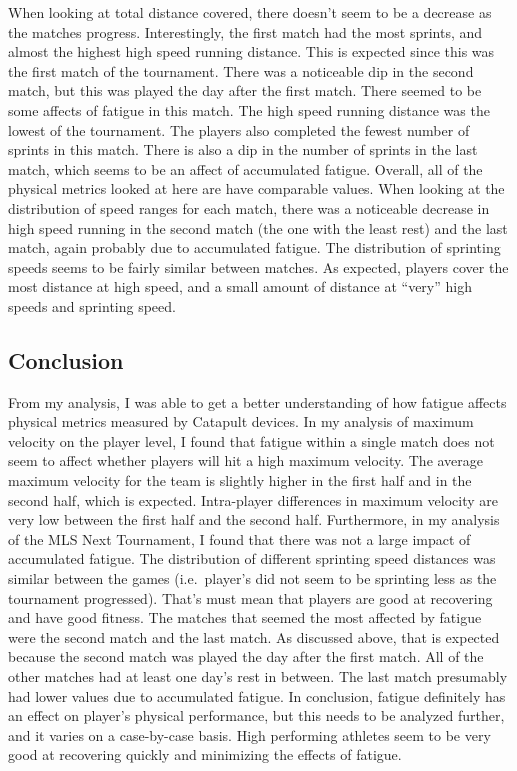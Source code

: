\documentclass[
  letterpaper,
  DIV=11,
  numbers=noendperiod]{scrartcl}
\begin{document}
When looking at total distance covered, there doesn't seem to be a
decrease as the matches progress. Interestingly, the first match had the
most sprints, and almost the highest high speed running distance. This
is expected since this was the first match of the tournament. There was
a noticeable dip in the second match, but this was played the day after
the first match. There seemed to be some affects of fatigue in this
match. The high speed running distance was the lowest of the tournament.
The players also completed the fewest number of sprints in this match.
There is also a dip in the number of sprints in the last match, which
seems to be an affect of accumulated fatigue. Overall, all of the
physical metrics looked at here are have comparable values. When looking
at the distribution of speed ranges for each match, there was a
noticeable decrease in high speed running in the second match (the one
with the least rest) and the last match, again probably due to
accumulated fatigue. The distribution of sprinting speeds seems to be
fairly similar between matches. As expected, players cover the most
distance at high speed, and a small amount of distance at ``very'' high
speeds and sprinting speed.

\hypertarget{conclusion}{%
\subsection{Conclusion}\label{conclusion}}

From my analysis, I was able to get a better understanding of how
fatigue affects physical metrics measured by Catapult devices. In my
analysis of maximum velocity on the player level, I found that fatigue
within a single match does not seem to affect whether players will hit a
high maximum velocity. The average maximum velocity for the team is
slightly higher in the first half and in the second half, which is
expected. Intra-player differences in maximum velocity are very low
between the first half and the second half. Furthermore, in my analysis
of the MLS Next Tournament, I found that there was not a large impact of
accumulated fatigue. The distribution of different sprinting speed
distances was similar between the games (i.e.~player's did not seem to
be sprinting less as the tournament progressed). That's must mean that
players are good at recovering and have good fitness. The matches that
seemed the most affected by fatigue were the second match and the last
match. As discussed above, that is expected because the second match was
played the day after the first match. All of the other matches had at
least one day's rest in between. The last match presumably had lower
values due to accumulated fatigue. In conclusion, fatigue definitely has
an effect on player's physical performance, but this needs to be
analyzed further, and it varies on a case-by-case basis. High performing
athletes seem to be very good at recovering quickly and minimizing the
effects of fatigue.
\end{document}
